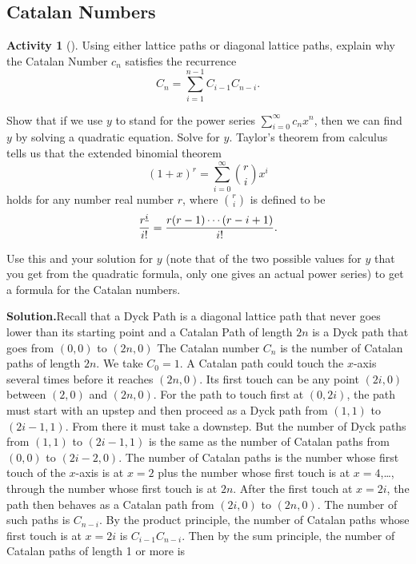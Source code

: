 \documentclass[10pt,]{book}
\theoremstyle{plain}
\theoremstyle{definition}
\newtheorem{activity}[project]{Activity}
\numberwithin{equation}{chapter}
\begin{document}
\subsection[{Catalan Numbers}]{Catalan Numbers}\label{subsection-50}
\begin{activity}[]\label{CatalanRecurrence}
Using either lattice paths or diagonal lattice paths, explain why the Catalan Number \(c_n\) satisfies the recurrence%
\begin{equation*}
C_n = \sum_{i=1}^{n-1} C_{i-1}C_{n-i}.
\end{equation*}
%
\par
Show that if we use \(y\) to stand for the power series \(\sum_{i=0}^\infty c_nx^n\), then we can find \(y\) by solving a quadratic equation. Solve for \(y\). Taylor's theorem from calculus tells us that the extended binomial theorem%
\begin{equation*}
(1+x)^r = \sum_{i=0}^\infty \binom{r}{i}x^i
\end{equation*}
holds for any number real number \(r\), where \(\binom{r}{i}\) is defined to be%
\begin{equation*}
{r^{\underline{i}}\over i!} = \frac{r(r-1)\cdots(r-i+1)}{i!}.
\end{equation*}
%
\par
Use this and your solution for \(y\) (note that of the two possible values for \(y\) that you get from the quadratic formula, only one gives an actual power series) to get a formula for the Catalan numbers.%
\par\medskip\noindent%
\textbf{Solution.}\quad Recall that a Dyck Path is a diagonal lattice path that never goes lower than its starting point and a Catalan Path of length \(2n\) is a Dyck path that goes from \((0,0)\) to \((2n,0)\) The Catalan number \(C_n\) is the number of Catalan paths of length \(2n\). We take \(C_0=1\). A Catalan path could touch the \(x\)-axis several times before it reaches \((2n,0)\). Its first touch can be any point \((2i,0)\) between \((2,0)\) and \((2n,0)\). For the path to touch first at \((0,2i)\), the path must start with an upstep and then proceed as a Dyck path from \((1,1)\) to \((2i-1,1)\). From there it must take a downstep. But the number of Dyck paths from \((1,1)\) to \((2i-1,1)\) is the same as the number of Catalan paths from \((0,0)\) to \((2i-2,0)\). The number of Catalan paths is the number whose first touch of the \(x\)-axis is at \(x=2\) plus the number whose first touch is at \(x=4\),\dots{}, through the number whose first touch is at \(2n\). After the first touch at \(x=2i\), the path then behaves as a Catalan path from \((2i,0)\) to \((2n,0)\). The number of such paths is \(C_{n-i}\). By the product principle, the number of Catalan paths whose first touch is at \(x=2i\) is \(C_{i-1}C_{n-i}\). Then by the sum principle, the number of Catalan paths of length 1 or more is%

\end{activity}
\end{document}
